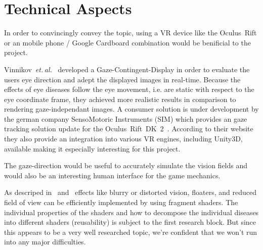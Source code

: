 \documentclass{acm_proc_article-sp}
\newcommand{\etal}{\textit{et. al.}}
\begin{document}
\section{Technical Aspects}
In order to convincingly convey the topic, using a VR device like the
Oculus Rift or an mobile phone / Google Cardboard combination would
be benificial to the project.

Vinnikov \etal \cite{gazedisplays} developed a Gaze-Contingent-Display in order
to evaluate the users eye direction and adept the displayed images in real-time.
Because the effects of eye diseases follow the eye movement, i.e. are static
with respect to the eye coordinate frame, they achieved more realistic results
in comparison to rendering gaze-independant images.
A consumer solution is under development by the german company
SensoMotoric Instruments (SIM) which provides an gaze tracking solution update
for the Oculus Rift DK 2 \cite{smi-oculus, arstechoculus}.
According to their website they also provide an integration into various VR
engines, including Unity3D, available making it especially interesting for
this project.

The gaze-direction would be useful to accurately simulate the vision fields
and would also be an interesting human interface for the game mechanics.

As descriped in \cite{gazedisplays} and \cite{eyediseasesim} effects like
blurry or distorted vision, floaters, and reduced field of view can be
efficiently implemented by using fragment shaders. The individual properties
of the shaders and how to decompose the individual diseases into different
shaders (reusability) is subject to the first research block. But since this
appears to be a very well researched topic, we're confident that we won't run
into any major difficulties.
\end{document}
